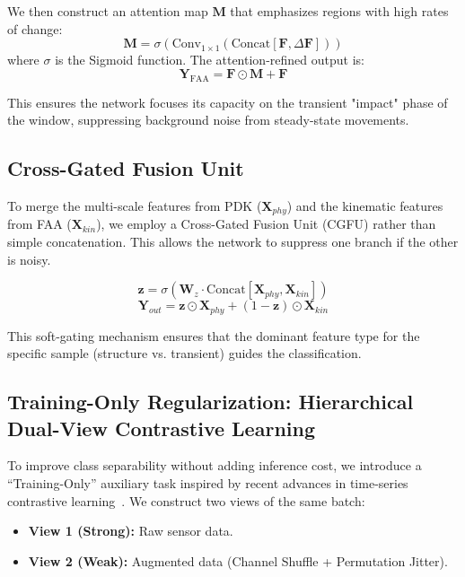 \documentclass{article}
\begin{document}
We then construct an attention map $\mathbf{M}$ that emphasizes regions with high rates of change:
\begin{equation}
\mathbf{M} = \sigma(\text{Conv}_{1\times1}(\text{Concat}[\mathbf{F}, \Delta \mathbf{F}]))
\end{equation}
where $\sigma$ is the Sigmoid function. The attention-refined output is:
\begin{equation}
\mathbf{Y}_{\text{FAA}} = \mathbf{F} \odot \mathbf{M} + \mathbf{F}
\end{equation}

This ensures the network focuses its capacity on the transient "impact" phase of the window, suppressing background noise from steady-state movements.

\subsection{Cross-Gated Fusion Unit}

To merge the multi-scale features from PDK ($\mathbf{X}_{phy}$) and the kinematic features from FAA ($\mathbf{X}_{kin}$), we employ a Cross-Gated Fusion Unit (CGFU) rather than simple concatenation. This allows the network to suppress one branch if the other is noisy.

\begin{equation}
\mathbf{z} = \sigma(\mathbf{W}_z \cdot \text{Concat}[\mathbf{X}_{phy}, \mathbf{X}_{kin}])
\end{equation}
\begin{equation}
\mathbf{Y}_{out} = \mathbf{z} \odot \mathbf{X}_{phy} + (1-\mathbf{z}) \odot \mathbf{X}_{kin}
\end{equation}

This soft-gating mechanism ensures that the dominant feature type for the specific sample (structure vs. transient) guides the classification.

\subsection{Training-Only Regularization: Hierarchical Dual-View Contrastive Learning}

To improve class separability without adding inference cost, we introduce a ``Training-Only'' auxiliary task inspired by recent advances in time-series contrastive learning~\cite{Eldele2021TSTCC,Zhang2022TFC}. We construct two views of the same batch:
\begin{itemize}
\item \textbf{View 1 (Strong):} Raw sensor data.
\item \textbf{View 2 (Weak):} Augmented data (Channel Shuffle + Permutation Jitter).
\end{itemize}
\end{document}
